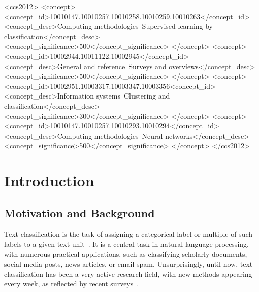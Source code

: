 \documentclass[acmsmall,nonacm]{acmart}
\begin{document}

\begin{CCSXML}
<ccs2012>
   <concept>
       <concept_id>10010147.10010257.10010258.10010259.10010263</concept_id>
       <concept_desc>Computing methodologies~Supervised learning by classification</concept_desc>
       <concept_significance>500</concept_significance>
       </concept>
   <concept>
       <concept_id>10002944.10011122.10002945</concept_id>
       <concept_desc>General and reference~Surveys and overviews</concept_desc>
       <concept_significance>500</concept_significance>
       </concept>
   <concept>
       <concept_id>10002951.10003317.10003347.10003356<concept_id>
       <concept_desc>Information systems~Clustering and classification</concept_desc>
       <concept_significance>300</concept_significance>
       </concept>
   <concept>
       <concept_id>10010147.10010257.10010293.10010294</concept_id>
       <concept_desc>Computing methodologies~Neural networks</concept_desc>
       <concept_significance>500</concept_significance>
       </concept>
 </ccs2012>
\end{CCSXML}


\renewcommand{\shortauthors}{Galke et al.}

\maketitle

\clearpage
\tableofcontents
\clearpage

\section{Introduction}

\subsection{Motivation and Background}

Text classification is the task of assigning a categorical label or multiple of such labels to a given text unit~\cite{DBLP:journals/csur/Sebastiani02,DBLP:journals/tkde/MoreoES20}. 
It is a central task in natural language processing, with numerous practical applications, such as classifying scholarly documents, social media posts, news articles, or email spam.
Unsurprisingly, until now, text classification has been a very active research field, with new methods appearing every week, as reflected by recent surveys~\cite{
DBLP:journals/tkde/HuLZHNL24,
fieldsSurveyTextClassification2024,
electronics13071199,
DBLP:journals/tist/LiPLXYSYH22,
DBLP:journals/csur/MinaeeKCNCG21,
DBLP:journals/corr/abs-2107-03158,
raihan2021-survey,
DBLP:journals/wias/ZhouGLVTBBK20, 
DBLP:journals/information/KowsariMHMBB19,
DBLP:journals/air/Kadhim19}. 
\end{document}
